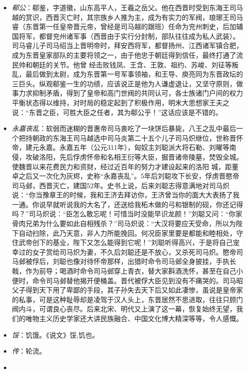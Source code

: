 \documentclass[]{book}
\providecommand{\tightlist}{%
  \setlength{\itemsep}{0pt}\setlength{\parskip}{0pt}}
\begin{document}
\begin{itemize}
\tightlist
\item
  \emph{郗公}：郗鉴，字道徽，山东高平人，王羲之岳父。他在西晋时受到东海王司马越的赏识，西晋灭亡时，其宗族乡人推为主，成为有实力的军阀，琅琊王司马睿（东晋第一任皇帝晋元帝，曾经是司马越的跟班）任命为兖州刺史，后加辅国将军，都督兖州诸军事（西晋由于实行分封制，部队往往成为私人武装）。司马睿儿子司马绍当上晋明帝时，拜安西将军，都督扬州、江西诸军镇合肥，成为东晋皇家部队的主要将领之一，由于他忠于朝廷得到信任，最终打通了流民帅和朝廷的关节。他曾
  经击败钱凤、王含、王敦、祖约、苏峻、刘征等叛乱，最后做到太尉，成为东晋第一号军事领袖，和王导、庾亮同为东晋政坛的三巨头。纵观郗鉴一生的功绩，应该说正是他为人谦虚退让，又坚守原则，做事力求抑制矛盾，得到了皇帝和高门世阀的共同认可，各士族诸门户间的权力平衡状态得以维持，对时局的稳定起到了积极作用，明末大思想家王夫之说：``东晋之臣，可胜大臣之任者，其为郗公乎！''这话应该是不错的。
\item
  \emph{永嘉丧乱}：软弱而迷糊的晋惠帝司马衷吃了一块饼后暴毙，八王之乱中最后一个把持朝政的东海王司马越选中司马炎第二十五个儿子司马炽继位，世称晋怀帝，建元永嘉。永嘉五年（公元311年），匈奴主刘聪派大将石勒、刘曜等南侵，攻破洛阳，先后俘虏怀帝和名相王衍等大臣，掘晋诸帝陵墓，焚毁全城。使魏晋以来花费民力和资财，经过近百年的努力才建设起来的洛阳
  城，距董卓之后又一次化为灰烬，史称``永嘉丧乱''。5年后刘聪攻下长安，俘虏晋愍帝司马邺，西晋灭亡，建国52年。史书上说，后来刘聪志得意满地对司马炽说：``你当豫章王的时候，我和王济去拜访你，王济曾当你的面大大表扬了我一通。你说早就听说我的大名了，还送给我柘木做的弓和银制的砚，你还记得吗？''司马炽说：``臣怎么敢忘呢！可惜当时没能早识龙颜！''刘聪又问：``你家骨肉兄弟为什么要如此自相残杀？''司马炽说：``大汉将要应天受命，所以为陛下自动扫除，此乃天意，非人力所能挽回。何况臣家里要是都能和睦相处，守住武帝创下的基业，陛下又怎么能得到它呢！''刘聪听得高兴，于是将自己宠幸过的女子赏给司马炽为妻，不久后刘聪还是不放心，又杀死司马炽。愍帝司马邺被俘后，刘聪也像对待怀帝那样，出猎时命令司马邺全身披挂，手执长戟，作为前导；喝酒时命令司马邺穿上青衣，替大家斟酒洗怀，甚至在自己小便时，命令司马邺替他揭开便桶盖。晋代被俘大臣见到没有不痛哭的。司马昭父子得到天下用了卑鄙的手段，其子孙失去天下后又如此凄惨，虽说是皇帝家的私事，可是这种耻辱却是凌驾于汉人头上，东晋居然不思进取，往往只顾门阀内斗，可谓良心丧尽。后来北宋、明代又上演了这一幕，恢复始终无望，我们的唯物主义历史学家还大讲民族融合、中国文化博大精深等等，令人感慨。
\item
  \emph{馁}：饥饿。《说文》馁,饥也。
\item
  \emph{传}：轮流。
\item

\end{itemize}
\end{document}
